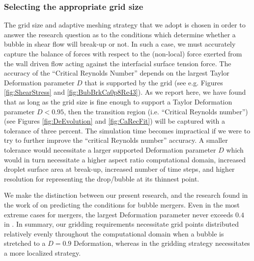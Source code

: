 \documentclass{elsarticle}
\begin{document}
\subsubsection{Selecting the appropriate grid size}

The grid size and adaptive meshing strategy that we adopt is chosen in order to
answer the research question as to the conditions which determine whether a
bubble in shear flow will break-up or not.  In such a case, we must accurately
capture the balance of forces with respect to the (non-local) force exerted
from the wall driven flow acting against the interfacial surface tension force.
The accuracy of the ``Critical Reynolds Number'' depends on the largest Taylor
Deformation parameter $D$ that is supported by the grid (see e.g. Figures
\ref{fig:ShearStress} and \ref{fig:BubBrkCa0p8Re43}).  As we report here, we
have found that as long as the grid size is fine enough to support a Taylor
Deformation parameter $D<0.95$, then the transition region (i.e. ``Critical
Reynolds number'') (see Figures \ref{fig:DeEvolution} and \ref{fig:CaRecFit})
will be captured with a tolerance of three percent.  The simulation time
becomes impractical if we were to try to further improve the ``critical
Reynolds number'' accuracy.  A smaller tolerance would necessitate a larger
supported Deformation parameter $D$ which would in turn necessitate a higher
aspect ratio computational domain, increased droplet surface area at break-up,
increased number of time steps, and higher resolution for representing the
drop/bubble at its thinnest point.

We make the distinction between our present research, and the research found in
the work of  \citet{zhang2021three,zhang2022three} on
predicting the conditions for bubble mergers.  Even in the most extreme cases
for mergers, the largest Deformation parameter never exceeds $0.4$ in
\citet{zhang2021three}.  In summary, our gridding requirements necessitate grid
points distributed relatively evenly throughout the computational domain when a
bubble is stretched to a $D=0.9$ Deformation, whereas in \citet{zhang2021three}
the gridding strategy necessitates a more localized strategy.
\end{document}
